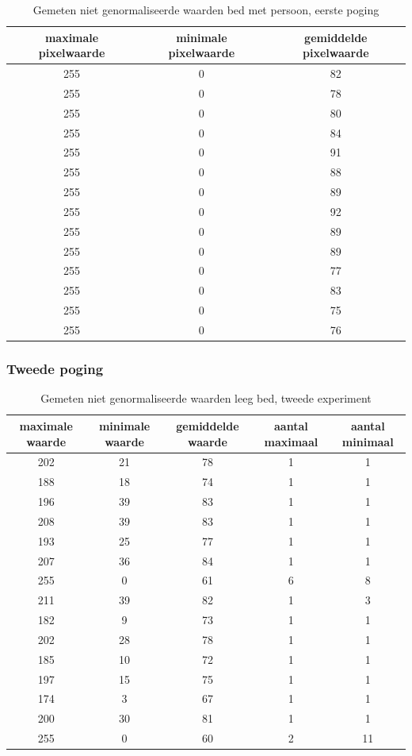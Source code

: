 \begin{table}[hbp]
	\caption{Gemeten niet genormaliseerde waarden bed met persoon, eerste poging}
	\begin{tabular}{|c|c|c|}
		\hline
		maximale pixelwaarde & minimale pixelwaarde & gemiddelde pixelwaarde \\ \hline
		255 & 0 & 82 \\ \hline
		255 & 0 & 78 \\ \hline
		255 & 0 & 80 \\ \hline
		255 & 0 & 84 \\ \hline
		255 & 0 & 91 \\ \hline
		255 & 0 & 88 \\ \hline
		255 & 0 & 89 \\ \hline
		255 & 0 & 92 \\ \hline
		255 & 0 & 89 \\ \hline
		255 & 0 & 89 \\ \hline
		255 & 0 & 77 \\ \hline
		255 & 0 & 83 \\ \hline
		255 & 0 & 75 \\ \hline
		255 & 0 & 76 \\ \hline
	\end{tabular}
	
	\label{refTabPZNP}
\end{table}

\subsubsection{Tweede poging}
\begin{table}[hbp]
	\caption{Gemeten niet genormaliseerde waarden leeg bed, tweede experiment}
	\begin{tabular}{|c|c|c|c|c|}
		\hline
		maximale waarde & minimale waarde & gemiddelde waarde & aantal maximaal & aantal minimaal\\ \hline
		202 & 21 & 78 & 1 & 1\\ \hline
		188 & 18 & 74 & 1 & 1\\ \hline
		196 & 39 & 83 & 1 & 1 \\ \hline
		208 & 39 & 83 & 1 & 1 \\ \hline
		193 & 25 & 77 & 1 & 1 \\ \hline
		207 & 36 & 84 & 1 & 1 \\ \hline
		255 & 0  & 61 & 6 & 8 \\ \hline
		211 & 39 & 82 & 1 & 3 \\ \hline
		182 & 9  & 73 & 1 & 1 \\ \hline
		202 & 28 & 78 & 1 & 1 \\ \hline
		185 & 10 & 72 & 1 & 1 \\ \hline
		197 & 15 & 75 & 1 & 1 \\ \hline
		174 & 3  & 67 & 1 & 1 \\ \hline
		200 & 30 & 81 & 1 & 1 \\ \hline
		255 & 0  & 60 & 2 & 11\\ \hline
	\end{tabular}
	\label{refTabPZNLT}
\end{table}

